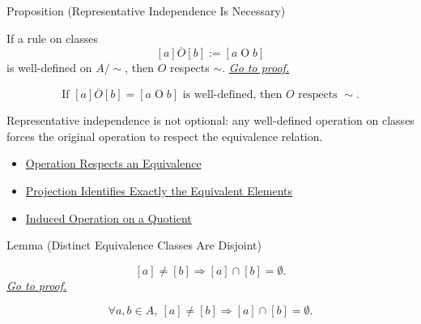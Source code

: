\begin{propositionbox}{Proposition (Representative Independence Is Necessary)}
\begin{proposition}
\label{prop:representative-independence-is-necessary}
If a rule on classes
\[
[a]\mathbin{\overline{O}}[b]:=[a\mathbin{O}b]
\]
is well-defined on $A/{\sim}$, then $O$ respects $\sim$.
\hyperref[prf:representative-independence-is-necessary]{\textit{Go to proof.}}
\end{proposition}
\end{propositionbox}

\begin{remark*}
\[
\text{If } [a]\mathbin{\overline{O}}[b]=[a\mathbin{O}b]
\text{ is well-defined, then } O \text{ respects } \sim.
\]
\end{remark*}

\begin{remark*}[Interpretation]
Representative independence is not optional: any well-defined operation on
classes forces the original operation to respect the equivalence relation.
\end{remark*}

\begin{dependencies}
\begin{itemize}
  \item \hyperref[def:operation-respects-equivalence]{Operation Respects an Equivalence}
  \item \hyperref[prop:projection-identifies-equivalent-elements]{Projection Identifies Exactly the Equivalent Elements}
  \item \hyperref[thm:induced-operation-on-quotient]{Induced Operation on a Quotient}
\end{itemize}
\end{dependencies}

\begin{lemmabox}{Lemma (Distinct Equivalence Classes Are Disjoint)}
\begin{lemma}
\label{lem:distinct-equivalence-classes-are-disjoint}
\[
[a]\ne[b] \Longrightarrow [a]\cap[b]=\emptyset.
\]
\hyperref[prf:distinct-equivalence-classes-are-disjoint]{\textit{Go to proof.}}
\end{lemma}
\end{lemmabox}

\begin{remark*}
\[
\forall a,b\in A,\ [a]\ne[b] \Longrightarrow [a]\cap[b]=\emptyset.
\]
\end{remark*}

